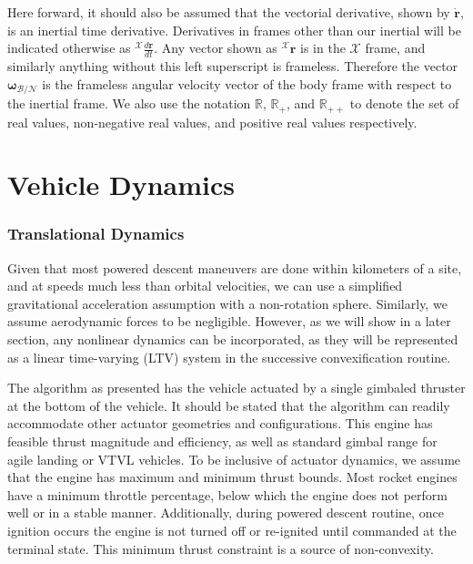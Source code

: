 Here forward, it should also be assumed that the vectorial derivative, shown by $\mathbf{\dot{r}}$, is an inertial time derivative. Derivatives in frames other than our inertial will be indicated otherwise as $^\mathcal{X}\frac{d \mathbf{r}}{dt}$. Any vector shown as $^\mathcal{X}\mathbf{r}$ is in the $\mathcal{X}$ frame, and similarly anything without this left superscript is frameless. Therefore the vector $\bm{\omega}_{\mathcal{B/N}}$ is the frameless angular velocity vector of the body frame with respect to the inertial frame. We also use the notation $\mathbb{R}$, $\mathbb{R}_+$, and $\mathbb{R}_{++}$ to denote the set of real values, non-negative real values, and positive real values respectively.


\section{Vehicle Dynamics}
\subsubsection{Translational Dynamics}
Given that most powered descent maneuvers are done within kilometers of a site, and at speeds much less than orbital velocities, we can use a simplified gravitational acceleration assumption with a non-rotation sphere. Similarly, we assume aerodynamic forces to be negligible. However, as we will show in a later section, any nonlinear dynamics can be incorporated, as they will be represented as a linear time-varying (LTV) system in the successive convexification routine.

The algorithm as presented has the vehicle actuated by a single gimbaled thruster at the bottom of the vehicle. It should be stated that the algorithm can readily accommodate other actuator geometries and configurations. This engine has feasible thrust magnitude and efficiency, as well as standard gimbal range for agile landing or VTVL vehicles. To be inclusive of actuator dynamics, we assume that the engine has maximum and minimum thrust bounds. Most rocket engines have a minimum throttle percentage, below which the engine does not perform well or in a stable manner. Additionally, during powered descent routine, once ignition occurs the engine is not turned off or re-ignited until commanded at the terminal state. This minimum thrust constraint is a source of non-convexity.

